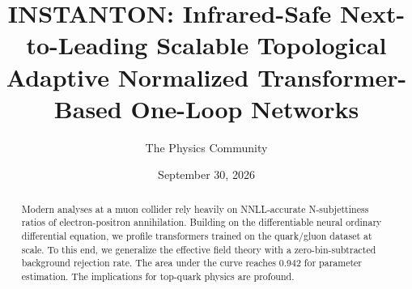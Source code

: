 \documentclass[11pt]{article}
\title{INSTANTON: Infrared-Safe Next-to-Leading Scalable Topological Adaptive Normalized Transformer-Based One-Loop Networks}
\author{The Physics Community}
\date{September 30, 2026}
\begin{document}
\maketitle
\begin{abstract}
Modern analyses at a muon collider rely heavily on NNLL-accurate
N-subjettiness ratios of electron-positron annihilation. Building on the
differentiable neural ordinary differential equation, we profile
transformers trained on the quark/gluon dataset at scale. To this end,
we generalize the effective field theory with a zero-bin-subtracted
background rejection rate. The area under the curve reaches 0.942 for
parameter estimation. The implications for top-quark physics are
profound.
\end{abstract}
\tableofcontents





\nocite{*}


\end{document}
